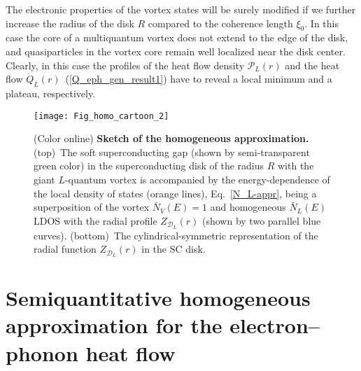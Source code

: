 \documentclass[prx,twocolumn,aps,superscriptaddress,showpacs,amsmath,amssymb,footnoteinbib]{revtex4-1}
\begin{document}
The electronic properties of the vortex states will be surely
modified if we further increase the radius of the disk $R$
compared to the coherence length $\xi_0$. In this case the core of
a multiquantum vortex does not extend to the edge of the disk, and
quasiparticles in the vortex core remain well localized near the
disk center. Clearly, in this case the profiles of the heat flow
density $\mathcal{P}_L(r)$ and the heat
flow $\dot{Q}_L(r)$~(\ref{Q_eph_gen_result1}) have to reveal a
local minimum and a plateau, respectively.
%

\begin{figure}[t!]
\texttt{[image: Fig\_homo\_cartoon\_2]}
\caption{(Color online) \textbf{Sketch of the homogeneous
approximation.} (top)~The soft superconducting gap (shown by
semi-transparent green color) in the superconducting disk of the
radius $R$ with the giant $L$-quantum vortex is accompanied by the
energy-dependence of the local density of states (orange lines),
Eq.~\eqref{N_L-appr}, being a superposition of the vortex
$\bar{N}_V(E)=1$ and homogeneous $\bar{N}_L(E)$ LDOS with the
radial profile $Z_{\mathcal{D}_L}(r)$ (shown by two parallel blue
curves). (bottom)~The cylindrical-symmetric representation of the
radial function $Z_{\mathcal{D}_L}(r)$ in the SC disk. }
\label{Fig_homo_cartoon}
\end{figure}

\section{Semiquantitative
homogeneous approximation for the electron--phonon heat flow}\label{HeatFluxHomoSect}
\end{document}
